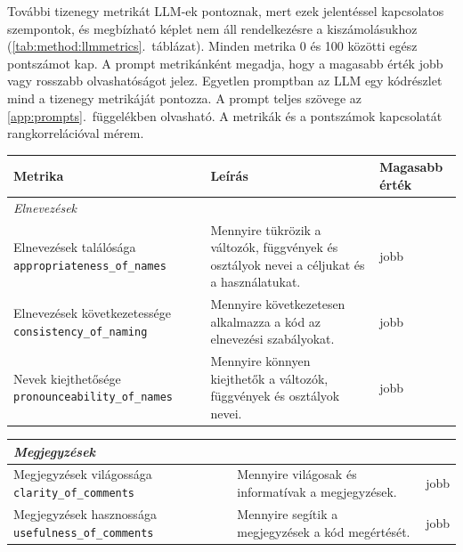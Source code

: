 \documentclass[
]{elteikthesis}[2024/04/26]
\begin{document}
További tizenegy metrikát LLM-ek pontoznak, mert ezek jelentéssel kapcsolatos
szempontok, és megbízható képlet nem áll rendelkezésre a kiszámolásukhoz
(\ref{tab:method:llmmetrics}.~táblázat). Minden metrika 0 és 100 közötti egész
pontszámot kap. A prompt metrikánként megadja, hogy a magasabb érték jobb vagy
rosszabb olvashatóságot jelez. Egyetlen promptban az LLM egy kódrészlet mind a
tizenegy metrikáját pontozza. A prompt teljes szövege az
\ref{app:prompts}.~függelékben olvasható. A metrikák és a pontszámok kapcsolatát
rangkorrelációval mérem.

\begin{table}[htb]
	\centering
	\small
	\let\oldtexttt\texttt
	\renewcommand{\texttt}[1]{\oldtexttt{\footnotesize #1}}
	\begin{tabular}{ | p{5.9cm} | p{5.5cm} | p{1.9cm} | }
		\hline
		\textbf{Metrika} & \textbf{Leírás} & \textbf{Magasabb érték} \\
		\hline \hline
		\multicolumn{3}{|l|}{\textit{Elnevezések}} \\
		\hline
		Elnevezések találósága \newline \texttt{appropriateness\_of\_names} &
		Mennyire tükrözik a változók, függvények és osztályok nevei a céljukat és
		a használatukat. & jobb \\
		\hline
		Elnevezések következetessége \newline \texttt{consistency\_of\_naming} &
		Mennyire következetesen alkalmazza a kód az elnevezési szabályokat. & jobb \\
		\hline
		Nevek kiejthetősége \newline \texttt{pronounceability\_of\_names} &
		Mennyire könnyen kiejthetők a változók, függvények és osztályok nevei. &
		jobb \\
		\hline
	\end{tabular}\par\medskip
	\begin{tabular}{ | p{5.9cm} | p{5.5cm} | p{1.9cm} | }
		\hline
		\multicolumn{3}{|l|}{\textit{Megjegyzések}} \\
		\hline
		Megjegyzések világossága \newline \texttt{clarity\_of\_comments} &
		Mennyire világosak és informatívak a megjegyzések. & jobb \\
		\hline
		Megjegyzések hasznossága \newline \texttt{usefulness\_of\_comments} &
		Mennyire segítik a megjegyzések a kód megértését. & jobb \\
		\hline

\end{tabular}
\end{table}
\end{document}
